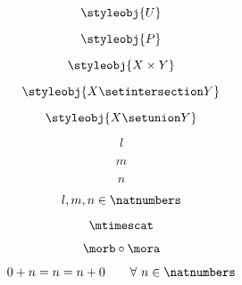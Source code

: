 {\begin{forslides}
        \begin{equation}
            \label{eq:33}
            \styleobj{U}
        \end{equation}

        \begin{equation}
            \label{eq:34}
            \styleobj{P}
        \end{equation}

        \begin{equation}
            \label{eq:35}
            \styleobj{X \times Y}
        \end{equation}

        \begin{equation}
            \label{eq:36}
            \styleobj{X \setintersection Y}
        \end{equation}

        \begin{equation}
            \label{eq:37}
            \styleobj{X \setunion Y}
        \end{equation}

        \begin{equation}
            \label{eq:38}
            l
        \end{equation}

        \begin{equation}
            \label{eq:39}
            m
        \end{equation}

        \begin{equation}
            \label{eq:40}
            n
        \end{equation}

        \begin{equation}
            \label{eq:41}
            l, m, n \in \natnumbers
        \end{equation}

        \begin{equation}
            \label{eq:42}
            \mtimescat
        \end{equation}

        \begin{equation}
            \label{eq:43}
            \morb \circ \mora
        \end{equation}

        \begin{equation}
            \label{eq:44}
            0 + n = n = n + 0   \quad \quad \forall \ n \in \natnumbers
        \end{equation}


\end{forslides}}
